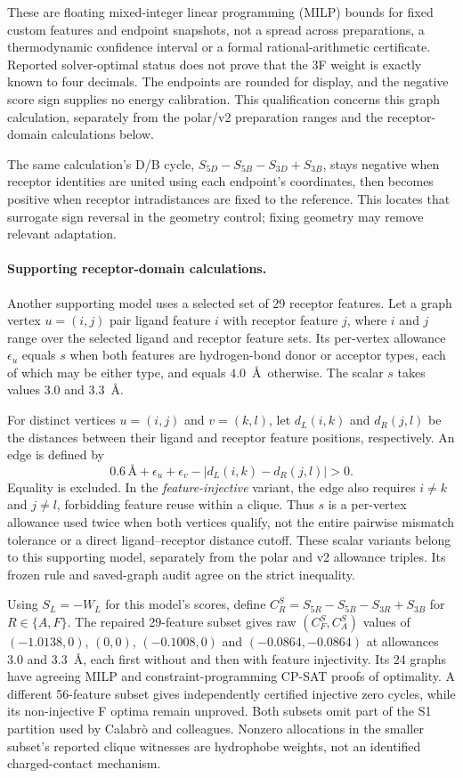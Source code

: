 \documentclass{article}
\begin{document}
These are floating mixed-integer linear programming (MILP) bounds for fixed custom features and endpoint snapshots, not a spread across preparations, a thermodynamic confidence interval or a formal rational-arithmetic certificate. Reported solver-optimal status does not prove that the 3F weight is exactly known to four decimals. The endpoints are rounded for display, and the negative score sign supplies no energy calibration. This qualification concerns this graph calculation, separately from the polar/v2 preparation ranges and the receptor-domain calculations below.

The same calculation's D/B cycle, \(S_{5D}-S_{5B}-S_{3D}+S_{3B}\), stays negative when receptor identities are united using each endpoint's coordinates, then becomes positive when receptor intradistances are fixed to the reference. This locates that surrogate sign reversal in the geometry control; fixing geometry may remove relevant adaptation.

\paragraph{Supporting receptor-domain calculations.}
Another supporting model uses a selected set of 29 receptor features. Let a graph vertex \(u=(i,j)\) pair ligand feature \(i\) with receptor feature \(j\), where \(i\) and \(j\) range over the selected ligand and receptor feature sets. Its per-vertex allowance \(\epsilon_u\) equals \(s\) when both features are hydrogen-bond donor or acceptor types, each of which may be either type, and equals \(4.0\)~\AA\ otherwise. The scalar \(s\) takes values \(3.0\) and \(3.3\)~\AA.

For distinct vertices \(u=(i,j)\) and \(v=(k,l)\), let \(d_L(i,k)\) and \(d_R(j,l)\) be the distances between their ligand and receptor feature positions, respectively. An edge is defined by
\[
 0.6\,\text{\AA}+\epsilon_u+\epsilon_v
       -|d_L(i,k)-d_R(j,l)|>0.
\]
Equality is excluded. In the \emph{feature-injective} variant, the edge also requires \(i\ne k\) and \(j\ne l\), forbidding feature reuse within a clique. Thus \(s\) is a per-vertex allowance used twice when both vertices qualify, not the entire pairwise mismatch tolerance or a direct ligand--receptor distance cutoff. These scalar variants belong to this supporting model, separately from the polar and v2 allowance triples. Its frozen rule and saved-graph audit agree on the strict inequality.

Using \(S_L=-W_L\) for this model's scores, define \(C_R^S=S_{5R}-S_{5B}-S_{3R}+S_{3B}\) for \(R\in\{A,F\}\). The repaired 29-feature subset gives raw \((C_F^S,C_A^S)\) values of \((-1.0138,0)\), \((0,0)\), \((-0.1008,0)\) and \((-0.0864,-0.0864)\) at allowances 3.0 and 3.3~\AA, each first without and then with feature injectivity. Its 24 graphs have agreeing MILP and constraint-programming CP-SAT proofs of optimality. A different 56-feature subset gives independently certified injective zero cycles, while its non-injective F optima remain unproved. Both subsets omit part of the S1 partition used by Calabr\`o and colleagues. Nonzero allocations in the smaller subset's reported clique witnesses are hydrophobe weights, not an identified charged-contact mechanism.
\end{document}
